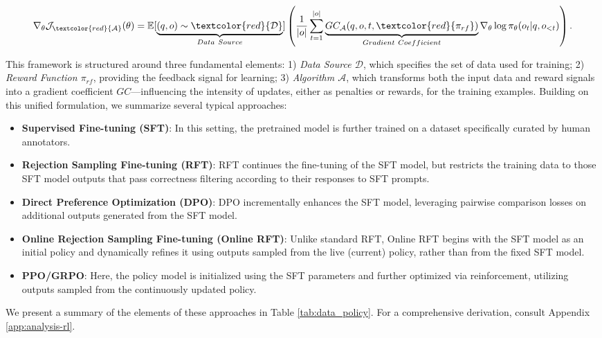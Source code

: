 \begin{itemize}[topsep=0pt]
\begin{equation}
    \nabla_{\theta}\mathcal{J}_{\textcolor{red}{\mathcal{A}}}(\theta) = \mathbb{E}[\underbrace{(q,o) \sim \textcolor{red}{\mathcal{D}}}_{Data \ Source}]\left( \frac{1}{|o|} \sum_{t=1}^{|o|}  \underbrace{GC_{{\mathcal{A}}}(q, o, t, \textcolor{red}{\pi_{{rf}}})}_{Gradient \ Coefficient}  \nabla_{\theta}\log \pi_{\theta}(o_t | q, o_{<t})\right).
\label{eq:objective}
\end{equation}

This framework is structured around three fundamental elements: 1) \textit{Data Source $\mathcal{D}$}, which specifies the set of data used for training; 2) \textit{Reward Function $\pi_{{rf}}$}, providing the feedback signal for learning; 3) \textit{Algorithm $\mathcal{A}$}, which transforms both the input data and reward signals into a gradient coefficient $GC$—influencing the intensity of updates, either as penalties or rewards, for the training examples. Building on this unified formulation, we summarize several typical approaches:

\begin{itemize}
    \item  \textbf{Supervised Fine-tuning (SFT)}: In this setting, the pretrained model is further trained on a dataset specifically curated by human annotators.
    \item \textbf{Rejection Sampling Fine-tuning (RFT)}: RFT continues the fine-tuning of the SFT model, but restricts the training data to those SFT model outputs that pass correctness filtering according to their responses to SFT prompts.
    \item \textbf{Direct Preference Optimization (DPO)}: DPO incrementally enhances the SFT model, leveraging pairwise comparison losses on additional outputs generated from the SFT model.
    \item \textbf{Online Rejection Sampling Fine-tuning (Online RFT)}: Unlike standard RFT, Online RFT begins with the SFT model as an initial policy and dynamically refines it using outputs sampled from the live (current) policy, rather than from the fixed SFT model.
    \item \textbf{PPO/GRPO}: Here, the policy model is initialized using the SFT parameters and further optimized via reinforcement, utilizing outputs sampled from the continuously updated policy.
\end{itemize}

We present a summary of the elements of these approaches in Table \ref{tab:data_policy}. For a comprehensive derivation, consult Appendix \ref{app:analysis-rl}.


\end{itemize}
